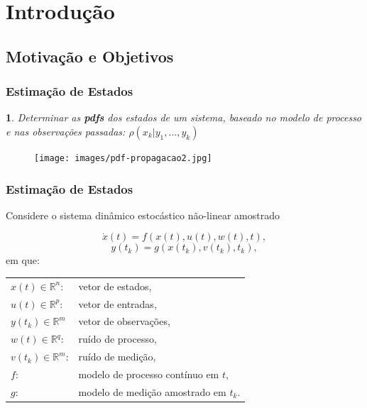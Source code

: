 \documentclass{beamer}
\renewcommand{\(}{\left(}
\renewcommand{\)}{\right)}
\renewcommand{\[}{\left[}
\renewcommand{\]}{\right]}
\newtheorem{definicao}{}
\begin{document}

\section{Introdução} 

\subsection{Motivação e Objetivos} 


\begin{frame}
	\frametitle{Estimação de Estados}
	\begin{definicao}
		Determinar as \textbf{pdfs} dos estados de um sistema, baseado no modelo de processo e nas observações passadas: $\rho(x_k | y_1,...,y_k)$ \\
	\end{definicao}
	
	\begin{figure}
		\centering

		\texttt{[image: images/pdf-propagacao2.jpg]}
	\end{figure}

\end{frame}


\begin{frame}
\frametitle{Estimação de Estados}
Considere o sistema dinâmico estocástico não-linear amostrado

\begin{equation*}\label{eq:processo}
\dot{x}(t)=f(x(t),u(t),w(t),t),
\end{equation*}
\begin{equation*}\label{eq:obs}
y(t_k)=g(x(t_k),v(t_k),t_k),
\end{equation*}
\vspace{0.3cm}
em que:
\vspace{0.4cm}

\begin{tabular}{l l}
	\hfill
	$x(t) \in \mathbb{R}^n$:  	& vetor de estados, \\
	\hfill
	$u(t) \in \mathbb{R}^p$:  	& vetor de entradas, \\
	\hfill
	$y(t_k) \in \mathbb{R}^m$ 	& vetor de observações, \\
	\hfill
	$w(t) \in \mathbb{R}^q$:	 	& ruído de processo, \\
	\hfill
	$v(t_k) \in \mathbb{R}^m$: 	& ruído de medição, \\
	\hfill
	$f$: 		& modelo de processo contínuo em $t$, \\
	\hfill
	$g$:  	 	& modelo de medição amostrado em $t_k$.
\end{tabular}

\end{frame}
\end{document}
